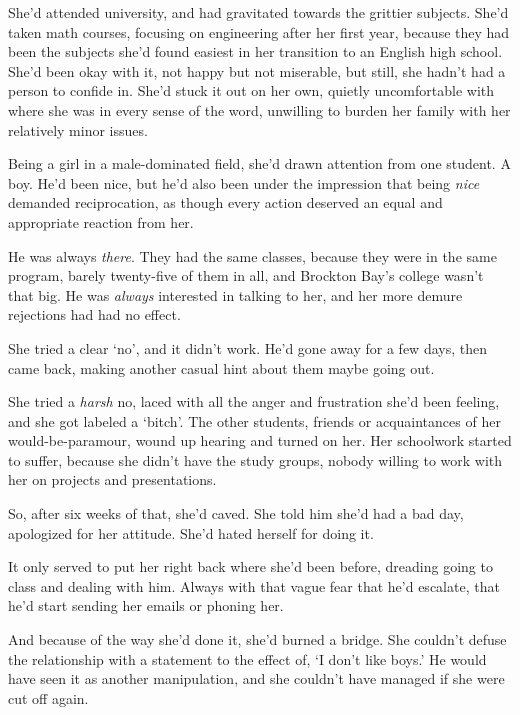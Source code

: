 She'd attended university, and had gravitated towards the grittier subjects.  She'd taken math courses, focusing on engineering after her first year, because they had been the subjects she'd found easiest in her transition to an English high school.  She'd been okay with it, not happy but not miserable, but still, she hadn't had a person to confide in.  She'd stuck it out on her own, quietly uncomfortable with where she was in every sense of the word, unwilling to burden her family with her relatively minor issues.



Being a girl in a male-dominated field, she'd drawn attention from one student.  A boy.  He'd been nice, but he'd also been under the impression that being \emph{nice} demanded reciprocation, as though every action deserved an equal and appropriate reaction from her.



He was always \emph{there}.  They had the same classes, because they were in the same program, barely twenty-five of them in all, and Brockton Bay's college wasn't that big.  He was \emph{always} interested in talking to her, and her more demure rejections had had no effect.



She tried a clear `no', and it didn't work.  He'd gone away for a few days, then came back, making another casual hint about them maybe going out.



She tried a \emph{harsh} no, laced with all the anger and frustration she'd been feeling, and she got labeled a `bitch'.  The other students, friends or acquaintances of her would-be-paramour, wound up hearing and turned on her.  Her schoolwork started to suffer, because she didn't have the study groups, nobody willing to work with her on projects and presentations.



So, after six weeks of that, she'd caved.  She told him she'd had a bad day, apologized for her attitude.  She'd hated herself for doing it.



It only served to put her right back where she'd been before, dreading going to class and dealing with him.  Always with that vague fear that he'd escalate, that he'd start sending her emails or phoning her.



And because of the way she'd done it, she'd burned a bridge.  She couldn't defuse the relationship with a statement to the effect of, `I don't like boys.'  He would have seen it as another manipulation, and she couldn't have managed if she were cut off again.



